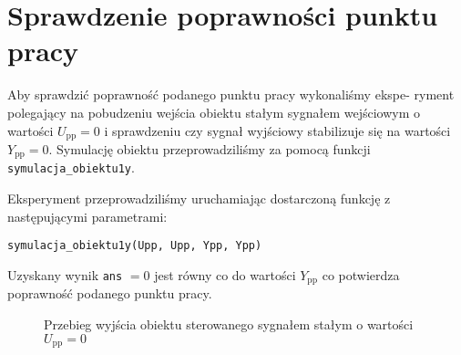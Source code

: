 \chapter{Sprawdzenie poprawności punktu pracy}
\label{pro1}

Aby sprawdzić poprawność podanego punktu pracy wykonaliśmy ekspe-
ryment polegający na pobudzeniu wejścia obiektu stałym sygnałem wejściowym o wartości
$U_{\mathrm{pp}} = \num{0}$ i sprawdzeniu czy sygnał wyjściowy stabilizuje się 
na wartości $Y_{\mathrm{pp}} = \num{0}$. Symulację obiektu przeprowadziliśmy
za pomocą funkcji \verb+symulacja_obiektu1y+. 

Eksperyment przeprowadziliśmy uruchamiając dostarczoną funkcję z następującymi parametrami:

\begin{center}
\verb+symulacja_obiektu1y(Upp, Upp, Ypp, Ypp)+ 
\end{center}

Uzyskany wynik \verb+ans+ $= \num{0}$ jest równy co do wartości $Y_{\mathrm{pp}}$ co potwierdza poprawność podanego
punktu pracy.

\begin{figure}[b]
    \centering
    \caption{Przebieg wyjścia obiektu sterowanego sygnałem stałym o wartości \mbox{$U_{\mathrm{pp}} = \num{0}$}}
    \label{pro1}
\end{figure}